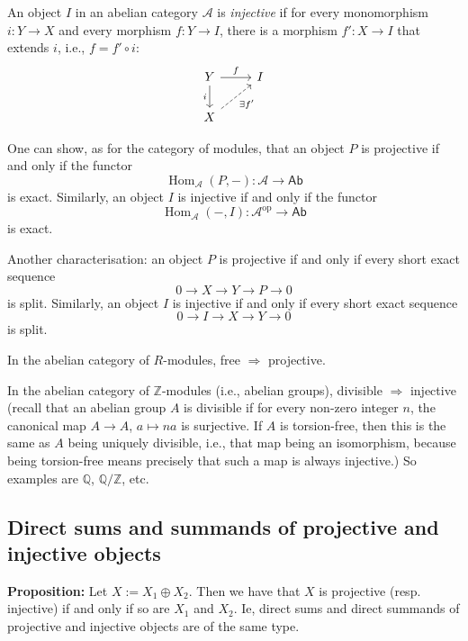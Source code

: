 \documentclass[11pt]{article}
\theoremstyle{definition}
\begin{document}
An object \(I\) in an abelian category \(\mathcal{A}\) is \emph{injective} if for every monomorphism \(i: Y \to X\) and every morphism \(f: Y \to I\), there is a morphism \(f': X \to I\) that extends \(i\), i.e., \(f = f' \circ i\):
\[
\begin{tikzcd}
Y \arrow[r, "f"] \arrow[d, "i"'] & I \\
X \arrow[ur, dashed, swap,"\exists f'"]
\end{tikzcd}
\]

One can show, as for the category of modules, that an object \(P\) is projective if and only if the functor
\[
\operatorname{Hom}_{\mathcal{A}}(P,-) : \mathcal{A} \to \mathsf{Ab}
\]
is exact. Similarly, an object \(I\) is injective if and only if the functor
\[
\operatorname{Hom}_{\mathcal{A}}(-,I) : \mathcal{A}^{\mathrm{op}} \to \mathsf{Ab}
\]
is exact.



Another characterisation: an object $P$ is projective if and only if every short exact sequence $$  0 \to X \to Y \to P \to 0 $$ is split. Similarly, an object $I$ is injective if and only if every short exact sequence $$  0 \to I \to X \to Y \to 0 $$ is split. 

In the abelian category of \(R\)-modules, free \(\Rightarrow\) projective.

In the abelian category of \(\mathbb{Z}\)-modules (i.e., abelian groups), divisible \(\Rightarrow\) injective (recall that an abelian group \(A\) is divisible if for every non-zero integer \(n\), the canonical map \(A \to A\), \(a \mapsto na\) is surjective. If \(A\) is torsion-free, then this is the same as \(A\) being uniquely divisible, i.e., that map being an isomorphism, because being torsion-free means precisely that such a map is always injective.) So examples are \(\mathbb{Q}\), \(\mathbb{Q} / \mathbb{Z}\), etc.


\subsection{Direct sums and summands of projective and injective objects}


\textbf{Proposition:} Let $X:= X_1 \oplus X_2$. Then we have that $X$ is projective (resp. injective) if and only if so are $X_1$ and $X_2$. Ie, direct sums and direct summands of projective and injective objects are of the same type.
\end{document}
